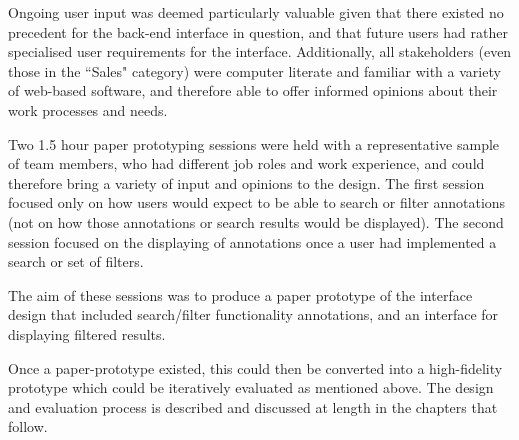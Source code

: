 Ongoing user input was deemed particularly valuable given that there existed no precedent for the back-end interface in question, and that future users had rather specialised user requirements for the interface. Additionally, all stakeholders (even those in the ``Sales" category) were computer literate and familiar with a variety of web-based software, and therefore able to offer informed opinions about their work processes and needs. 

Two 1.5 hour paper prototyping sessions were held with a representative sample of team members, who had different job roles and work experience, and could therefore bring a variety of input and opinions to the design. The first session focused only on how users would expect to be able to search or filter annotations (not on how those annotations or search results would be displayed). The second session focused on the displaying of annotations once a user had implemented a search or set of filters. 

The aim of these sessions was to produce a paper prototype of the interface design that included search/filter functionality annotations, and an interface for displaying filtered results. 

Once a paper-prototype existed, this could then be converted into a high-fidelity prototype which could be iteratively evaluated as mentioned above. The design and evaluation process is described and discussed at length in the chapters that follow.

